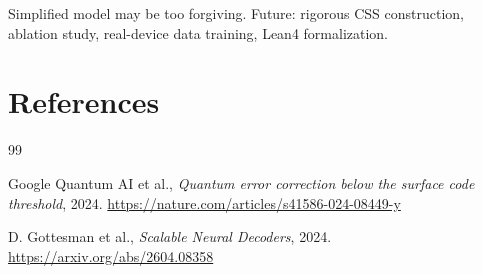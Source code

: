 \documentclass[11pt,a4paper]{article}
\begin{document}
Simplified model may be too forgiving. Future: rigorous CSS construction, ablation study, real-device data training, Lean4 formalization.

\section*{References}

\begin{thebibliography}{99}

 Google Quantum AI et al., \textit{Quantum error correction below the surface code threshold}, 2024. \url{https://nature.com/articles/s41586-024-08449-y}

 D. Gottesman et al., \textit{Scalable Neural Decoders}, 2024. \url{https://arxiv.org/abs/2604.08358}

\end{thebibliography}
\end{document}
